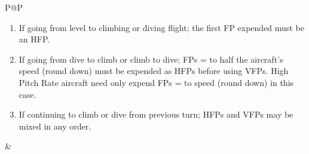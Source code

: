 \begin{twocolumntablefloat}
\begin{twocolumntable}
\begin{tabularx}{\linewidth}{P@{\hspace{1em}}P}
            \begin{enumerate}[nosep]
                \item If going from level to climbing or diving flight; the first FP expended must be an HFP.
                \item If going from dive to climb or climb to dive; FPs = to half the aircraft's speed (round down) must be expended as HFPs before using VFPs. High Pitch Rate aircraft need only expend FPs = to {\onethird} speed (round down) in this case.
                \item If continuing to climb or dive from previous turn; HFPs and VFPs may be mixed in any order.
            \end{enumerate}

            &




\end{tabularx}
\end{twocolumntable}
\end{twocolumntablefloat}
